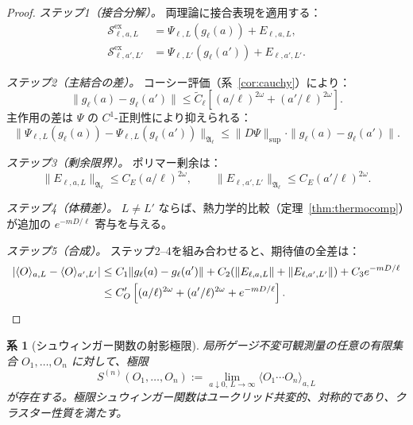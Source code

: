 \documentclass[12pt]{article}
\theoremstyle{plain}
\newtheorem{corollary}[theorem]{系}
\theoremstyle{definition}
\numberwithin{equation}{section}
\newcommand{\fA}{\mathfrak{A}}
\newcommand{\ex}{\mathrm{ex}}
\begin{document}
\begin{proof}
\emph{ステップ1（接合分解）。} 両理論に接合表現を適用する：
\begin{align}
\mathcal{S}^{\ex}_{\ell,a,L} &= \Psi_{\ell,L}(g_\ell(a))+E_{\ell,a,L},\\
\mathcal{S}^{\ex}_{\ell,a',L'} &= \Psi_{\ell,L'}(g_\ell(a'))+E_{\ell,a',L'}.
\end{align}

\emph{ステップ2（主結合の差）。} コーシー評価（系~\ref{cor:cauchy}）により：
\begin{equation}
\|g_\ell(a)-g_\ell(a')\| \leq \widetilde{C}_\ell\left[(a/\ell)^{2\omega}+(a'/\ell)^{2\omega}\right].
\end{equation}
主作用の差は $\Psi$ の $C^1$-正則性により抑えられる：
\begin{equation}
\|\Psi_{\ell,L}(g_\ell(a))-\Psi_{\ell,L}(g_\ell(a'))\|_{\fA_\ell} \leq \|D\Psi\|_{\sup}\cdot\|g_\ell(a)-g_\ell(a')\|.
\end{equation}

\emph{ステップ3（剰余限界）。} ポリマー剰余は：
\begin{equation}
\|E_{\ell,a,L}\|_{\fA_\ell}\leq C_E(a/\ell)^{2\omega},\qquad \|E_{\ell,a',L'}\|_{\fA_\ell}\leq C_E(a'/\ell)^{2\omega}.
\end{equation}

\emph{ステップ4（体積差）。} $L\neq L'$ ならば、熱力学的比較（定理~\ref{thm:thermocomp}）が追加の $e^{-mD/\ell}$ 寄与を与える。

\emph{ステップ5（合成）。} ステップ2--4を組み合わせると、期待値の全差は：
\begin{align}
|\langle O\rangle_{a,L}-\langle O\rangle_{a',L'}| &\leq C_1\|g_\ell(a)-g_\ell(a')\|+C_2(\|E_{\ell,a,L}\|+\|E_{\ell,a',L'}\|)+C_3 e^{-mD/\ell}\\
&\leq C_O'\left[(a/\ell)^{2\omega}+(a'/\ell)^{2\omega}+e^{-mD/\ell}\right].\qedhere
\end{align}
\end{proof}

\begin{corollary}[シュウィンガー関数の射影極限]\label{cor:schwingerlimit}
局所ゲージ不変可観測量の任意の有限集合 $O_1,\ldots,O_n$ に対して、極限
\begin{equation}
S^{(n)}(O_1,\ldots,O_n) := \lim_{a\downarrow 0,\,L\to\infty}\langle O_1\cdots O_n\rangle_{a,L}
\end{equation}
が存在する。極限シュウィンガー関数はユークリッド共変的、対称的であり、クラスター性質を満たす。
\end{corollary}
\end{document}
